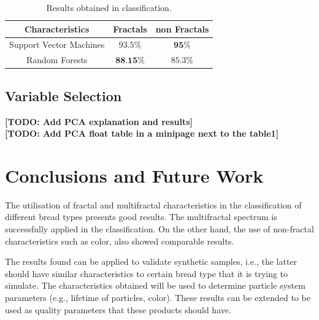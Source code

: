 \documentclass[oneside,a4paper,english,links]{amca}
\newcommand{\todo}[1]{\textbf{[TODO: #1]}}
\begin{document}
\begin{table}[htb]
\centering
\begin{tabular}{|c|c|c|}
    \hline
    Characteristics & Fractals & non Fractals\\
    \hline
    Support Vector Machines  & $93.5\%$ & $\textbf{95\%}$\\
    \hline
    Random Forests & $\textbf{88.15\%}$  & $85.3\%$\\
    \hline
\end{tabular}
\caption{Results obtained in classification. }
\label{table:table1}
\end{table}

\subsection{Variable Selection}
\todo{Add PCA explanation and results} \\
\todo{Add PCA float table in a minipage next to the table1}

\section{Conclusions and Future Work}
The utilisation of fractal and multifractal characteristics in the classification of different bread types presents good results. The multifractal spectrum is successfully applied in the classification. On the other hand, the use of non-fractal characteristics such as color, also showed comparable results.

The results found can be applied to validate synthetic samples, i.e., the latter should have similar characteristics to certain bread type that it is trying to simulate. The characteristics obtained will be used to determine particle system parameters \cite{Baravalle2011} (e.g., lifetime of particles, color). These results can be extended to be used as quality parameters that these products should have.

%

\end{document}
